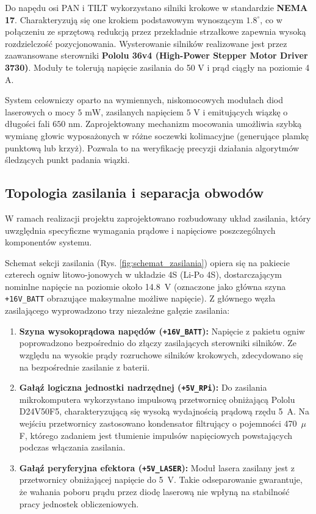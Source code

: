 \documentclass[a4paper,twoside,12pt]{book}
\begin{document}
Do napędu osi PAN i TILT wykorzystano silniki krokowe w standardzie \textbf{NEMA 17}. Charakteryzują się one krokiem podstawowym wynoszącym $1.8^\circ$, co w połączeniu ze sprzętową redukcją przez przekładnie strzałkowe zapewnia wysoką rozdzielczość pozycjonowania. Wysterowanie silników realizowane jest przez zaawansowane sterowniki \textbf{Pololu 36v4 (High-Power Stepper Motor Driver 3730)}. Moduły te tolerują napięcie zasilania do 50 V i prąd ciągły na poziomie 4 A.


\newpage
System celowniczy oparto na wymiennych, niskomocowych modułach diod laserowych o mocy $5\text{ mW}$, zasilanych napięciem $5\text{ V}$ i emitujących wiązkę o długości fali $650\text{ nm}$. Zaprojektowany mechanizm mocowania umożliwia szybką wymianę głowic wyposażonych w różne soczewki kolimacyjne (generujące plamkę punktową lub krzyż). Pozwala to na weryfikację precyzji działania algorytmów śledzących punkt padania wiązki.

\subsection{Topologia zasilania i separacja obwodów}

W ramach realizacji projektu zaprojektowano rozbudowany układ zasilania, który uwzględnia specyficzne wymagania prądowe i napięciowe poszczególnych komponentów systemu.

Schemat sekcji zasilania (Rys. \ref{fig:schemat_zasilania}) opiera się na pakiecie czterech ogniw litowo-jonowych w układzie 4S (Li-Po 4S), dostarczającym nominlne napięcie na poziomie około 14.8~V (oznaczone jako główna szyna \texttt{+16V\_BATT} obrazujące maksymalne możliwe napięcie). Z głównego węzła zasilającego wyprowadzono trzy niezależne gałęzie zasilania:

\begin{enumerate}
    \item \textbf{Szyna wysokoprądowa napędów (\texttt{+16V\_BATT}):} Napięcie z pakietu ogniw poprowadzono bezpośrednio do złączy zasilających sterowniki silników. Ze względu na wysokie prądy rozruchowe silników krokowych, zdecydowano się na bezpośrednie zasilanie z baterii.
    \item \textbf{Gałąź logiczna jednostki nadrzędnej (\texttt{+5V\_RPi}):} Do zasilania mikrokomputera wykorzystano impulsową przetwornicę obniżającą Pololu D24V50F5, charakteryzującą się wysoką wydajnością prądową rzędu 5~A. Na wejściu przetwornicy zastosowano kondensator filtrujący o pojemności 470~$\mu$F, którego zadaniem jest tłumienie impulsów napięciowych powstających podczas włączania zasilania.
    \item \textbf{Gałąź peryferyjna efektora (\texttt{+5V\_LASER}):} Moduł lasera zasilany jest z przetwornicy obniżającej napięcie do 5~V. Takie odseparowanie gwarantuje, że wahania poboru prądu przez diodę laserową nie wpłyną na stabilność pracy jednostek obliczeniowych.
\end{enumerate}
\end{document}
